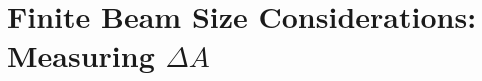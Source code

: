 %
%
%
%

\section{Finite Beam Size Considerations: Measuring $\Delta A$}
\label{sec:finite_beam_size}

